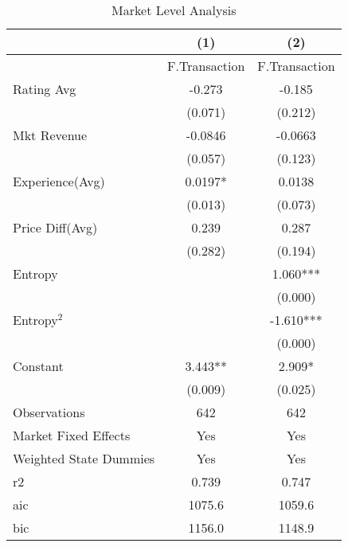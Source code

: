 \begin{table}[]
\centering
\begin{tabular}{@{}lcc@{}}
\toprule
                       & (1)           & (2)           \\ \midrule
                       & F.Transaction & F.Transaction \\
Rating Avg             & -0.273        & -0.185        \\
                       & (0.071)       & (0.212)       \\
Mkt Revenue            & -0.0846       & -0.0663       \\
                       & (0.057)       & (0.123)       \\
Experience(Avg)        & 0.0197*       & 0.0138        \\
                       & (0.013)       & (0.073)       \\
Price Diff(Avg)        & 0.239         & 0.287         \\
                       & (0.282)       & (0.194)       \\
Entropy                &               & 1.060***      \\
                       &               & (0.000)       \\
Entropy$^{2}$    &               & -1.610***     \\
                       &               & (0.000)       \\
Constant               & 3.443**       & 2.909*        \\
                       & (0.009)       & (0.025)       \\
Observations           & 642           & 642           \\
Market Fixed Effects   & Yes           & Yes           \\
Weighted State Dummies & Yes           & Yes           \\
r2                     & 0.739         & 0.747         \\
aic                    & 1075.6        & 1059.6        \\
bic                    & 1156.0        & 1148.9        \\ \bottomrule
\end{tabular}
\label{reg_mkt_simplified}
\caption{Market Level Analysis}
\end{table}